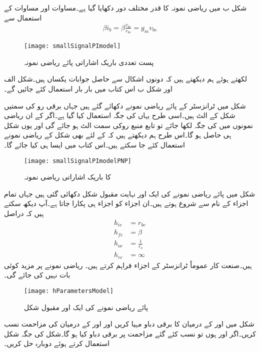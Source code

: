 شکل  ب میں  ریاضی نمونہ کا قدر مختلف دور دکھایا گیا ہے۔مساوات   اور مساوات   کے استعمال سے
\begin{align*}
\beta i_b = \beta \frac{v_{be}}{r_{be}}=g_m v_{be}
\end{align*}
%
\begin{figure}
\centering
\texttt{[image: smallSignalPImodel]}
\caption{پست تعددی باریک اشاراتی پائے ریاضی نمونہ }
\label{شکل_باریک_اشاراتی_پائے_ماڈل}
\end{figure}
لکھتے ہوئے ہم دیکھتے ہیں کہ دونوں اشکال سے حاصل جوابات یکساں ہیں۔شکل  الف اور شکل  ب اس کتاب میں بار بار استعمال کئے جائیں گے۔

شکل  میں  ٹرانزسٹر کے پائے ریاضی نمونے  دکھائے گئے ہیں جہاں برقی رو کی سمتیں  شکل  کے الٹ ہیں۔اسی طرح یہاں  کی جگہ  استعمال کیا گیا ہے۔اگر  کے ان ریاضی نمونوں میں  کی جگہ  لکھا جائے تو تابع منبع روکی سمت الٹ ہو جائے گی اور  یوں شکل  ہی حاصل ہو گا۔اس طرح ہم دیکھتے ہیں کہ  کے لئے بھی شکل  کے ریاضی نمونے  استعمال کئے جا سکتے ہیں۔اس کتاب میں ایسا ہی کیا جائے گا۔
\begin{figure}
\centering
\texttt{[image: smallSignalPImodelPNP]}
\caption{ کا باریک اشاراتی  ریاضی نمونہ }
\label{شکل_باریک_اشاراتی_پائے_ماڈل_الف}
\end{figure}
%
شکل  میں پائے ریاضی نمونے  کی ایک اور نہایت مقبول شکل دکھائی گئی ہیں جہاں تمام اجزاء کے نام  سے شروع ہوتے ہیں۔ان اجزاء کو  اجزاء ہی پکارا جاتا ہے۔آپ دیکھ سکتے ہیں کہ دراصل
\begin{align*}
h_{ie}&=r_{be}\\
h_{fe}&=\beta\\
h_{oe}&=\frac{1}{r_o}\\
h_{re}&=\infty
\end{align*}
ہیں۔صنعت کار عموماً ٹرانزسٹر کے  اجزاء فراہم کرتے ہیں۔ ریاضی نمونے  پر مزید کوئی بات نہیں کی جائے گی۔

% 
\begin{figure}
\centering
\texttt{[image: hParametersModel]}
\caption{پائے ریاضی نمونے  کی ایک اور مقبول شکل}
\label{شکل_باریک_اشاراتی_ایچ_پارامیٹر_پائے_ماڈل}
\end{figure}
شکل  میں  اور  کے درمیان  کا برقی دباو مہیا کریں اور  اور  کے درمیان  کی مزاحمت نسب کریں۔اگر  اور  ہوں تو نسب کئے گئے مزاحمت پر برقی دباو کیا ہو گا۔شکل  کی جگہ شکل  استعمال کرتے ہوئے دوبارہ حل کریں۔

